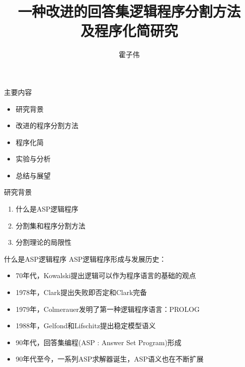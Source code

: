 \documentclass{beamer}
\title{一种改进的回答集逻辑程序分割方法\\及程序化简研究}
\author{霍子伟}
\institute{中山大学软件学院}
\begin{document}
\titlepage


\begin{frame}[t]{主要内容}
	\begin{itemize}
		\item {研究背景}
		\item {改进的程序分割方法
			}
		\item {程序化简}
		\item {实验与分析
			}
		\item {总结与展望
			}
	\end{itemize}
\end{frame}


\begin{frame}[t]{研究背景}
	\begin{enumerate}
		\item 什么是ASP逻辑程序
		\item 分割集和程序分割方法
		\item 分割理论的局限性
	\end{enumerate}
\end{frame}


\begin{frame}[t]{什么是ASP逻辑程序}
	ASP逻辑程序形成与发展历史：
	\begin{itemize}
		\item 70年代，Kowalski提出逻辑可以作为程序语言的基础的观点
		\item 1978年，Clark提出失败即否定和Clark完备
		\item 1979年，Colmerauer发明了第一种逻辑程序语言：PROLOG
		\item 1988年，Gelfond和Lifschitz提出稳定模型语义
		\item 90年代，回答集编程(ASP : Answer Set Program)形成
		\item 90年代至今，一系列ASP求解器诞生，ASP语义也在不断扩展
	\end{itemize}
\end{frame}
\end{document}
